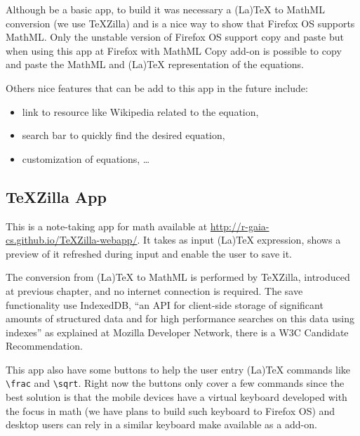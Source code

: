 Although be a basic app, to build it was necessary a (La)TeX to MathML
conversion (we use TeXZilla) and is a nice way to show that Firefox OS supports
MathML. Only the unstable version of Firefox OS support copy and paste but when
using this app at Firefox with MathML Copy add-on is possible to
copy and paste the MathML and (La)TeX representation of the equations.

Others nice features that can be add to this app in the
future include:
\begin{itemize}
  \item link to resource like Wikipedia related to the equation,
  \item search bar to quickly find the desired equation,
  \item customization of equations, \ldots
\end{itemize}

\subsection{TeXZilla App}

This is a note-taking app for math available at
\href{http://r-gaia-cs.github.io/TeXZilla-webapp/}{http://r-gaia-cs.github.io/TeXZilla-webapp/}.
It takes as input (La)TeX expression, shows a preview of it refreshed during
input and enable the user to save it.

The conversion from (La)TeX to MathML is performed by TeXZilla, introduced at
previous chapter, and no internet connection is required. The save functionality
use IndexedDB, ``an API for client-side storage of significant amounts of
structured data and for high performance searches on this data using indexes''
as explained at Mozilla Developer Network, there is a W3C Candidate
Recommendation.

This app also have some buttons to help the user entry (La)TeX commands like
{\tt \textbackslash frac} and {\tt \textbackslash sqrt}. Right now the buttons
only cover a few commands since the best solution is that the mobile devices
have a virtual keyboard developed with the focus in math (we have plans to build
such keyboard to Firefox OS) and desktop users can rely in a similar keyboard
make available as a add-on.
